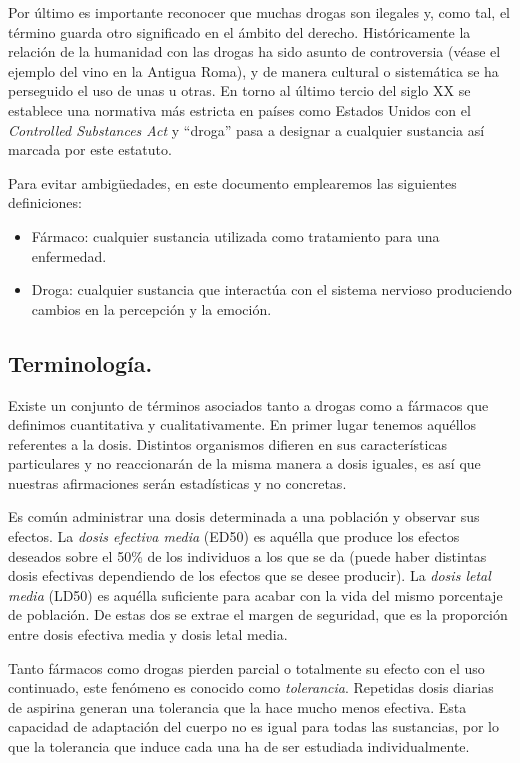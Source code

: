 Por último es importante reconocer que muchas drogas son ilegales y, como tal, el término guarda otro significado en el ámbito del derecho. Históricamente la relación de la humanidad con las drogas ha sido asunto de controversia (véase el ejemplo del vino en la Antigua Roma), y de manera cultural o sistemática se ha perseguido el uso de unas u otras. En torno al último tercio del siglo XX se establece una normativa más estricta en países como Estados Unidos con el \textit{Controlled Substances Act} y \enquote{droga} pasa a designar a cualquier sustancia así marcada por este estatuto.

Para evitar ambigüedades, en este documento emplearemos las siguientes definiciones:

\begin{itemize}
	\item Fármaco: cualquier sustancia utilizada como tratamiento para una enfermedad.
	\item Droga: cualquier sustancia que interactúa con el sistema nervioso produciendo cambios en la percepción y la emoción.
\end{itemize}

\subsection{Terminología.}

Existe un conjunto de términos asociados tanto a drogas como a fármacos que definimos cuantitativa y cualitativamente. En primer lugar tenemos aquéllos referentes a la dosis. Distintos organismos difieren en sus características particulares y no reaccionarán de la misma manera a dosis iguales, es así que nuestras afirmaciones serán estadísticas y no concretas.

Es común administrar una dosis determinada a una población y observar sus efectos. La \textit{dosis efectiva media} (ED50) es aquélla que produce los efectos deseados sobre el 50\% de los individuos a los que se da (puede haber distintas dosis efectivas dependiendo de los efectos que se desee producir). La \textit{dosis letal media} (LD50) es aquélla suficiente para acabar con la vida del mismo porcentaje de población. De estas dos se extrae el margen de seguridad, que es la proporción entre dosis efectiva media y dosis letal media.

Tanto fármacos como drogas pierden parcial o totalmente su efecto con el uso continuado, este fenómeno es conocido como \textit{tolerancia}. Repetidas dosis diarias de aspirina generan una tolerancia que la hace mucho menos efectiva. Esta capacidad de adaptación del cuerpo no es igual para todas las sustancias, por lo que la tolerancia que induce cada una ha de ser estudiada individualmente.

